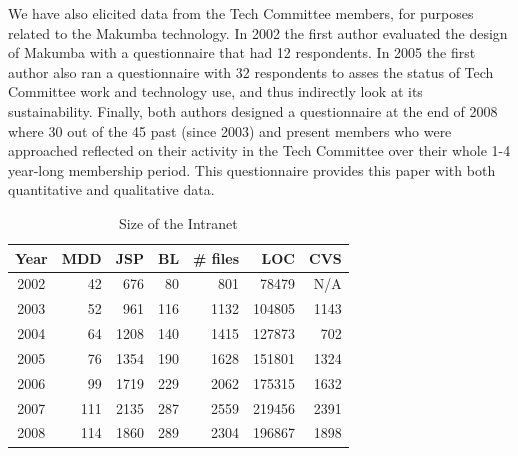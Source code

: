 \documentclass{llncs}
\begin{document}
We have also elicited data from the Tech Committee members, for purposes related to the Makumba technology. In 2002 the first author evaluated the design of Makumba with a questionnaire that had 12 respondents. In 2005 the first author also ran a questionnaire with 32 respondents to asses the status of Tech Committee work and technology use, and thus indirectly look at its sustainability. Finally, both authors designed a questionnaire at the end of 2008 where 30 out of the 45 past (since 2003) and present members who were approached reflected on their activity in the Tech Committee over their whole 1-4 year-long membership period. This questionnaire provides this paper with both quantitative and qualitative data. 

\begin{table}[t]
	\centering
	\begin{tabular}{c|r|r|r|r|r|r}
		\hline
		\hline
		Year	& MDD	& JSP	& BL	& \# files	& LOC		& CVS	 \\
		\hline
		\hline
		2002 	& 42	& 676	& 80	& 801		& 78479 	& N/A	 \\ 
		\hline
		2003 	& 52	& 961	& 116	& 1132		& 104805 	& 1143	 \\ 
		\hline
		2004 	& 64	& 1208	& 140	& 1415		& 127873 	& 702	 \\ 
		\hline
		2005 	& 76	& 1354	& 190	& 1628		& 151801 	& 1324	 \\ 
		\hline
		2006 	& 99	& 1719	& 229	& 2062		& 175315 	& 1632	 \\ 
		\hline
		2007 	& 111	& 2135	& 287	& 2559		& 219456 	& 2391	 \\ 
		\hline
		2008 	& 114	& 1860	& 289	& 2304		& 196867 	& 1898	 \\ 
		\hline
		
		\hline
		\hline
	\end{tabular}
	\caption{Size of the Intranet}
	\label{tab:intranet-size}
\end{table} 
\end{document}
